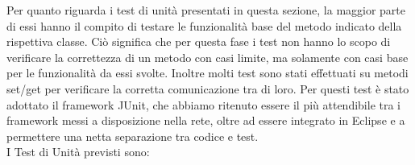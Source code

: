 Per quanto riguarda i test di unit\`a presentati in questa sezione, la maggior
parte di essi hanno il compito di testare le funzionalit\`a base del metodo
indicato della rispettiva classe. Ci\`o significa che per questa fase i test non
hanno lo scopo di verificare la correttezza di un metodo con casi limite, ma
solamente con casi base per le funzionalit\`a da essi svolte. Inoltre molti test
sono stati effettuati su metodi set/get per verificare la corretta comunicazione
tra di loro. Per questi test \`e stato adottato il framework JUnit, che abbiamo
ritenuto essere il pi\`u attendibile tra i framework messi a disposizione nella
rete, oltre ad essere integrato in Eclipse e a permettere una netta separazione
tra codice e test.\\

I Test di Unit\`a previsti sono:

